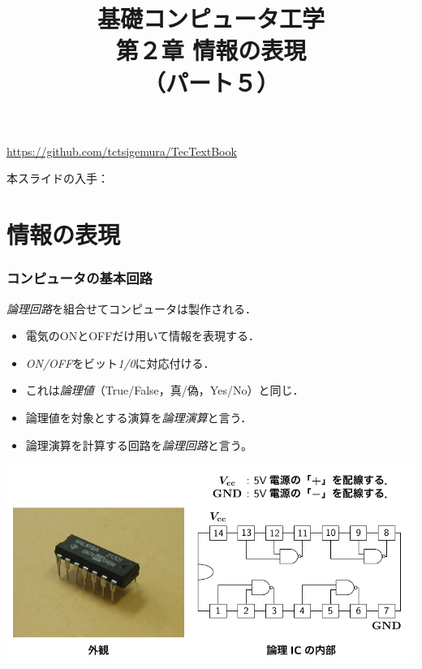 \documentclass{beamer}                 %
\begin{document}
\title{基礎コンピュータ工学\\第２章 情報の表現\\（パート５）}
\date{}

\begin{frame}
  \titlepage
  \centerline{\url{https://github.com/tctsigemura/TecTextBook}}
  \vfill
  \centerline{本スライドの入手：
    }
\end{frame}


\section{情報の表現}
\begin{frame}
  \frametitle{コンピュータの基本回路}
  \emph{論理回路}を組合せてコンピュータは製作される．
  \begin{itemize}
  \item 電気のONとOFFだけ用いて情報を表現する．
  \item \emph{ON/OFF}をビット\emph{1/0}に対応付ける．
  \item これは\emph{論理値}（True/False，真/偽，Yes/No）と同じ．
  \item 論理値を対象とする演算を\emph{論理演算}と言う．
  \item 論理演算を計算する回路を\emph{論理回路}と言う。
  \end{itemize}
  \vfill
  \centerline{\includegraphics[scale=0.7]{../Tikz/lic.pdf}}
\end{frame}
\end{document}
